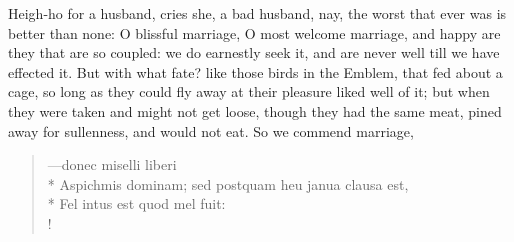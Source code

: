 Heigh-ho for a husband, cries she, a bad husband, nay, the worst that
ever was is better than none: O blissful marriage, O most welcome
marriage, and happy are they that are so coupled: we do earnestly seek
it, and are never well till we have effected it. But with what fate?
like those birds in the Emblem, that fed about a cage, so long as
they could fly away at their pleasure liked well of it; but when they
were taken and might not get loose, though they had the same meat,
pined away for sullenness, and would not eat. So we commend marriage,
%
\begin{latin}%
\begin{verse}%
---donec miselli liberi\\*
Aspichmis dominam; sed postquam heu janua clausa est,\\*
Fel intus est quod mel fuit:\\!
\end{verse}%
\end{latin}%

